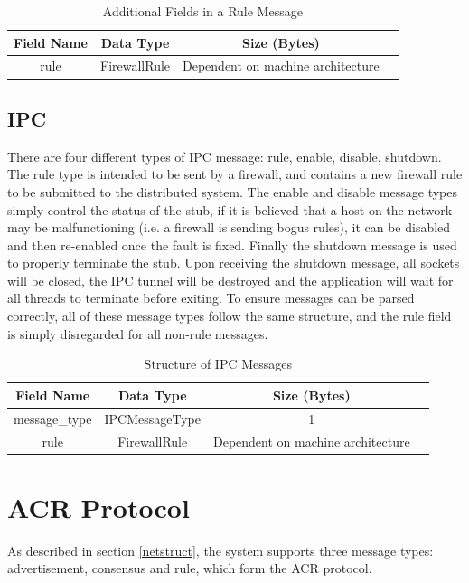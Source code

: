 \documentclass[a4paper, 11pt]{report}
\begin{document}
\begin{table}[H]
\centering
\begin{tabular}{ |c|c|c|c| } 
\hline
Field Name & Data Type & Size (Bytes) \\
\hline
rule & FirewallRule & Dependent on machine architecture \\ 
\hline
\end{tabular}
\caption{Additional Fields in a Rule Message}
\label{tab:rule}
\end{table}

\subsection{IPC}
There are four different types of \acrshort{IPC} message: rule, enable, disable, shutdown. The rule type is intended to be sent by a firewall, and contains a new firewall rule to be submitted to the distributed system. The enable and disable message types simply control the status of the stub, if it is believed that a host on the network may be malfunctioning (i.e. a firewall is sending bogus rules), it can be disabled and then re-enabled once the fault is fixed. Finally the shutdown message is used to properly terminate the \gls{stub}. Upon receiving the shutdown message, all sockets will be closed, the \acrshort{IPC} tunnel will be destroyed and the application will wait for all threads to terminate before exiting.
To ensure messages can be parsed correctly, all of these message types follow the same structure, and the rule field is simply disregarded for all non-rule messages.

\begin{table}[H]
\centering
\begin{tabular}{ |c|c|c|c| } 
\hline
Field Name & Data Type & Size (Bytes) \\
\hline
message_type & IPCMessageType & 1 \\
rule & FirewallRule & Dependent on machine architecture \\
\hline
\end{tabular}
\caption{Structure of \acrshort{IPC} Messages}
\label{tab:ipc}
\end{table}
 
\section{ACR Protocol}
As described in section \ref{netstruct}, the system supports three message types: advertisement, consensus and rule, which form the ACR protocol.
\end{document}
